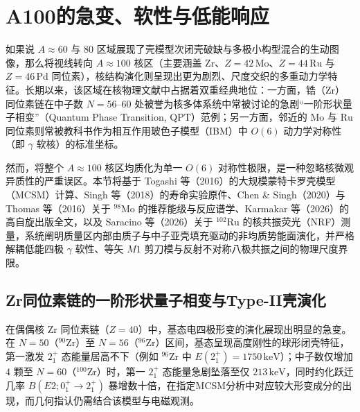 \section{A100的急变、软性与低能响应}\label{sec:4-3}

如果说 $A\approx 60$ 与 $80$ 区域展现了壳模型次闭壳破缺与多极小构型混合的生动图像，那么将视线转向 $A\approx 100$ 核区（主要涵盖 $\mathrm{Zr}$、$Z=42\,\mathrm{Mo}$、$Z=44\,\mathrm{Ru}$ 与 $Z=46\,\mathrm{Pd}$ 同位素），核结构演化则呈现出更为剧烈、尺度交织的多重动力学特征。长期以来，该区域在核物理文献中占据着双重经典地位：一方面，锆（$\mathrm{Zr}$）同位素链在中子数 $N=56\text{--}60$ 处被誉为核多体系统中常被讨论的急剧``一阶形状量子相变''（Quantum Phase Transition, QPT）范例；另一方面，邻近的 $\mathrm{Mo}$ 与 $\mathrm{Ru}$ 同位素则常被教科书作为相互作用玻色子模型（IBM）中 $O(6)$ 动力学对称性（即 $\gamma$ 软核）的标准坐标。

然而，将整个 $A\approx 100$ 核区均质化为单一 $O(6)$ 对称性极限，是一种忽略核微观异质性的严重误区。本节将基于 Togashi 等（2016）\cite{doctoral-r1-g28-togashi-2016-zr-mcsm-qpt}的大规模蒙特卡罗壳模型（MCSM）计算、Singh 等（2018）\cite{doctoral-r1-g28-singh-2018-98zr-lifetimes}的寿命实验原件、Chen \& Singh（2020）\cite{chen-singh-2020-nds-98mo}与 Thomas 等（2016）\cite{thomas-2016-96-98mo-coexistence}关于 $^{98}\mathrm{Mo}$ 的推荐能级与反应谱学、Karmakar 等（2026）\cite{karmakar-2026-98mo-octupole}的高自旋出版全文，以及 Saracino 等（2026）\cite{saracino-2026-102ru-scissors-octupole-resonances}关于 $^{102}\mathrm{Ru}$ 的核共振荧光（NRF）测量，系统阐明质量区内部由质子与中子亚壳填充驱动的非均质势能面演化，并严格解耦低能四极 $\gamma$ 软性、等矢 $M1$ 剪刀模与反射不对称八极共振之间的物理尺度界限。

\subsection{Zr同位素链的一阶形状量子相变与Type-II壳演化}\label{sec:4-3-1}

在偶偶核 $\mathrm{Zr}$ 同位素链（$Z=40$）中，基态电四极形变的演化展现出明显的急变。在 $N=50$（$^{90}\mathrm{Zr}$）至 $N=56$（$^{96}\mathrm{Zr}$）区间，基态呈现高度刚性的球形闭壳特征，第一激发 $2^+_1$ 态能量居高不下（例如 $^{96}\mathrm{Zr}$ 中 $E(2^+_1) = 1750\,\mathrm{keV}$）；中子数仅增加 4 颗至 $N=60$（$^{100}\mathrm{Zr}$）时，第一 $2^+_1$ 态能量急剧坠落至仅 $213\,\mathrm{keV}$，同时约化跃迁几率 $B(E2; 0^+_1 \to 2^+_1)$ 暴增数十倍，在指定MCSM分析中对应较大形变成分的出现，而几何指认仍需结合该模型与电磁观测。


